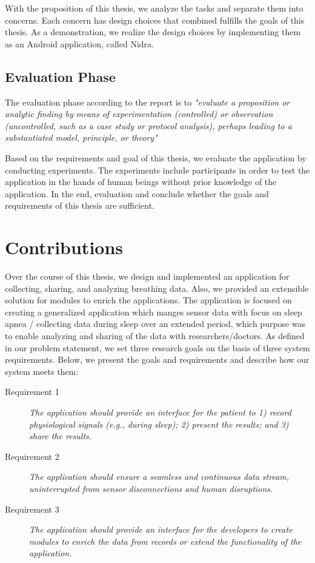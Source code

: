 With the proposition of this thesis, we analyze the tasks and separate them into concerns. Each concern has design choices that combined fulfills the goals of this thesis. As a demonstration, we realize the design choices by implementing them as an Android application, called Nidra. 

\subsection{Evaluation Phase}
The evaluation phase according to the report is to \textit{"evaluate a proposition or analytic finding by means of experimentation (controlled) or observation (uncontrolled, such as a case study or protocol analysis), perhaps leading to a substantiated model, principle, or theory"}

Based on the requirements and goal of this thesis, we evaluate the application by conducting experiments. The experiments include participants in order to test the application in the hands of human beings without prior knowledge of the application. In the end, evaluation and conclude whether the goals and requirements of this thesis are sufficient.

\section{Contributions}
Over the course of this thesis, we design and implemented an application for collecting, sharing, and analyzing breathing data. Also, we provided an extensible solution for modules to enrich the applications. The application is focused on creating a generalized application which manges sensor data with focus on sleep apnea / collecting data during sleep over an extended period, which purpose was to enable analyzing and sharing of the data with researchers/doctors. As defined in our problem statement, we set three research goals on the basis of three system requirements. Below, we present the goals and requirements and describe how our system meets them:

\begin{description}
    \item[Requirement 1] \textit{The application should provide an interface for the patient to 1) record physiological signals (e.g., during sleep); 2) present the results; and 3) share the results.}
    \item[Requirement 2] \textit{The application should ensure a seamless and continuous data stream, uninterrupted from sensor disconnections and human disruptions.}
    \item[Requirement 3] \textit{The application should provide an interface for the developers to create modules to enrich the data from records or extend the functionality of the application.}
\end{description}

